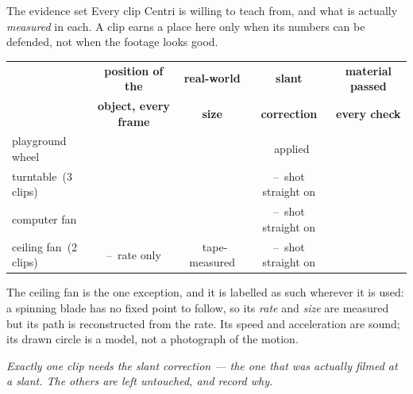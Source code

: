 \documentclass[aspectratio=169,10pt]{beamer}
\newcommand{\ok}{{\color{cApp}\textbf{\checkmark}}}
\newcommand{\nope}{{\color{cGrey}--}}
\newcommand{\takeaway}[1]{\vfill{\footnotesize\itshape\color{cGrey}#1\par}}
\begin{document}
\begin{frame}{The evidence set}
\scriptsize
Every clip Centri is willing to teach from, and what is actually \emph{measured} in each. A clip
earns a place here only when its numbers can be defended, not when the footage looks good.
\vspace{3pt}
\renewcommand{\arraystretch}{1.35}
\begin{center}
\begin{tabular}{@{}lcccc@{}}
\toprule
& \textbf{position of the} & \textbf{real-world} & \textbf{slant} & \textbf{material passed} \\
& \textbf{object, every frame} & \textbf{size} & \textbf{correction} & \textbf{every check} \\
\midrule
playground wheel & \ok & \ok & \ok\ {\color{cGrey}applied} & \ok \\
turntable {\color{cGrey}\,(3 clips)} & \ok & \ok & \nope\ {\color{cGrey}shot straight on} & \ok \\
computer fan & \ok & \ok & \nope\ {\color{cGrey}shot straight on} & \ok \\
ceiling fan {\color{cGrey}\,(2 clips)} & \nope\ {\color{cGrey}rate only} & \ok\ {\color{cGrey}tape-measured} & \nope\ {\color{cGrey}shot straight on} & \ok \\
\bottomrule
\end{tabular}
\end{center}
\vspace{4pt}
{\scriptsize The ceiling fan is the one exception, and it is labelled as such wherever it is used:
a spinning blade has no fixed point to follow, so its \emph{rate} and \emph{size} are measured but
its path is reconstructed from the rate. Its speed and acceleration are sound; its drawn circle is
a model, not a photograph of the motion.}
\takeaway{Exactly one clip needs the slant correction --- the one that was actually filmed at a slant.
The others are left untouched, and record why.}
\end{frame}
\end{document}

